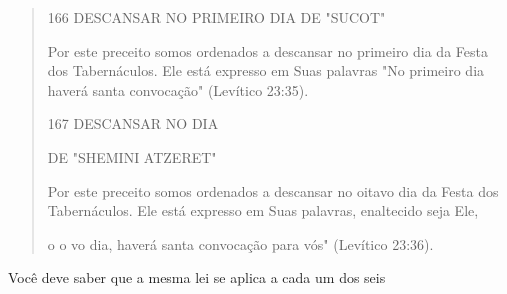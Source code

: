 \begin{quote}
166 DESCANSAR NO PRIMEIRO DIA DE "SUCOT"

Por este preceito somos ordenados a descansar no primeiro dia da Festa
dos Tabernáculos. Ele está expresso em Suas palavras "No primeiro dia
haverá santa convocação" (Levítico 23:35).

167 DESCANSAR NO DIA

DE "SHEMINI ATZERET"

Por este preceito somos ordenados a descansar no oitavo dia da Fes­ta
dos Tabernáculos. Ele está expresso em Suas palavras, enaltecido seja
Ele,

o o vo dia, haverá santa convocação para vós" (Levítico 23:36).
\end{quote}

Você deve saber que a mesma lei se aplica a cada um dos seis

